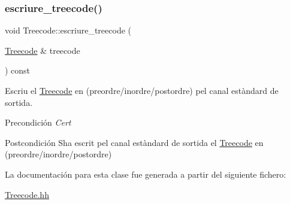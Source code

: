 \subsubsection{\texorpdfstring{escriure\+\_\+treecode()}{escriure\_treecode()}}
{\footnotesize\ttfamily void Treecode\+::escriure\+\_\+treecode (\begin{DoxyParamCaption}\item[{\hyperlink{class_treecode}{Treecode} \&}]{treecode }\end{DoxyParamCaption}) const}



Escriu el \hyperlink{class_treecode}{Treecode} en (preordre/inordre/postordre) pel canal estàndard de sortida. 

\begin{DoxyPrecond}{Precondición}
{\itshape Cert} 
\end{DoxyPrecond}
\begin{DoxyPostcond}{Postcondición}
S\textquotesingle{}ha escrit pel canal estàndard de sortida el \hyperlink{class_treecode}{Treecode} en (preordre/inordre/postordre) 
\end{DoxyPostcond}


La documentación para esta clase fue generada a partir del siguiente fichero\+:\begin{DoxyCompactItemize}
\item 
\hyperlink{_treecode_8hh}{Treecode.\+hh}\end{DoxyCompactItemize}
